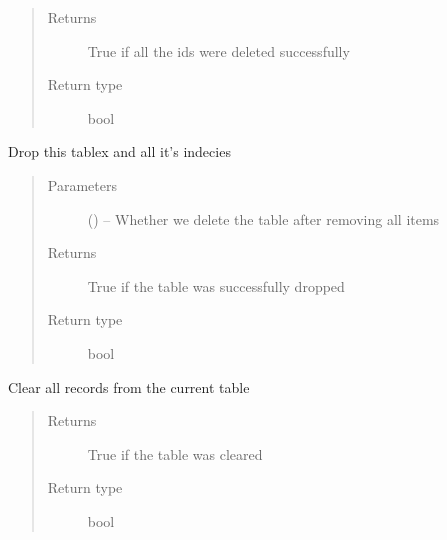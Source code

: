 \documentclass[letterpaper,10pt,english]{sphinxmanual}
\begin{document}
\begin{fulllineitems}
\begin{fulllineitems}
\begin{quote}
\begin{description}
\item[{Returns}] \leavevmode
True if all the ids were deleted successfully

\item[{Return type}] \leavevmode
bool

\end{description}\end{quote}

\end{fulllineitems}


\begin{fulllineitems}
\label{\detokenize{index:mamba.Table.drop}}
Drop this tablex and all it's indecies
\begin{quote}\begin{description}
\item[{Parameters}] \leavevmode
{} () -- Whether we delete the table after removing all items

\item[{Returns}] \leavevmode
True if the table was successfully dropped

\item[{Return type}] \leavevmode
bool

\end{description}\end{quote}

\end{fulllineitems}


\begin{fulllineitems}
\label{\detokenize{index:mamba.Table.empty}}
Clear all records from the current table
\begin{quote}\begin{description}
\item[{Returns}] \leavevmode
True if the table was cleared

\item[{Return type}] \leavevmode
bool

\end{description}\end{quote}

\end{fulllineitems}


\end{fulllineitems}
\end{document}
